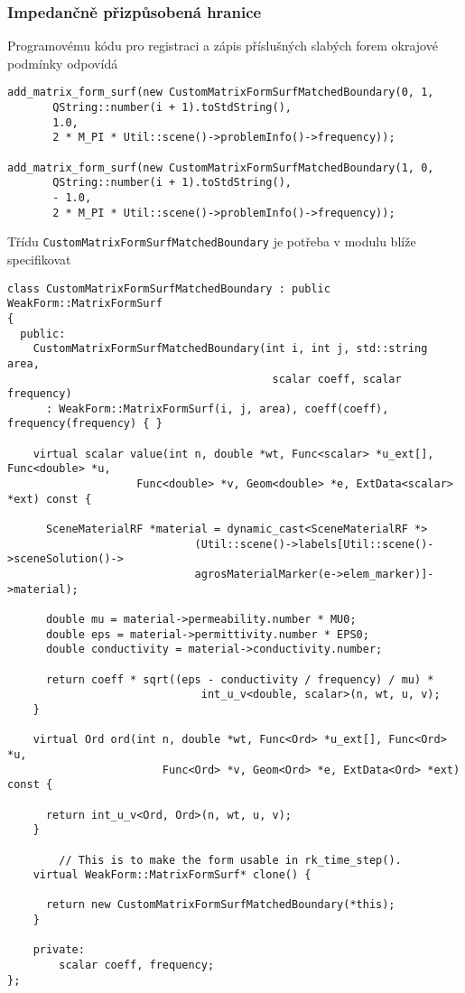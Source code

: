 \subsubsection*{Impedančně přizpůsobená hranice}
Programovému kódu pro registraci a zápis příslušných slabých forem okrajové podmínky odpovídá
\begin{verbatim}
add_matrix_form_surf(new CustomMatrixFormSurfMatchedBoundary(0, 1,
       QString::number(i + 1).toStdString(),
       1.0,
       2 * M_PI * Util::scene()->problemInfo()->frequency));
       
add_matrix_form_surf(new CustomMatrixFormSurfMatchedBoundary(1, 0,
       QString::number(i + 1).toStdString(),
       - 1.0,
       2 * M_PI * Util::scene()->problemInfo()->frequency));            
\end{verbatim}
Třídu \texttt{CustomMatrixFormSurfMatchedBoundary} je potřeba v modulu blíže specifikovat
\begin{verbatim}
class CustomMatrixFormSurfMatchedBoundary : public WeakForm::MatrixFormSurf
{
  public:
    CustomMatrixFormSurfMatchedBoundary(int i, int j, std::string area, 
                                         scalar coeff, scalar frequency)
      : WeakForm::MatrixFormSurf(i, j, area), coeff(coeff), frequency(frequency) { }

    virtual scalar value(int n, double *wt, Func<scalar> *u_ext[], Func<double> *u, 
                    Func<double> *v, Geom<double> *e, ExtData<scalar> *ext) const {
      
      SceneMaterialRF *material = dynamic_cast<SceneMaterialRF *>
                             (Util::scene()->labels[Util::scene()->sceneSolution()->
                             agrosMaterialMarker(e->elem_marker)]->material);

      double mu = material->permeability.number * MU0;
      double eps = material->permittivity.number * EPS0;
      double conductivity = material->conductivity.number;

      return coeff * sqrt((eps - conductivity / frequency) / mu) * 
                              int_u_v<double, scalar>(n, wt, u, v);
    }

    virtual Ord ord(int n, double *wt, Func<Ord> *u_ext[], Func<Ord> *u,
                        Func<Ord> *v, Geom<Ord> *e, ExtData<Ord> *ext) const {
    
      return int_u_v<Ord, Ord>(n, wt, u, v);
    }

        // This is to make the form usable in rk_time_step().
    virtual WeakForm::MatrixFormSurf* clone() {

      return new CustomMatrixFormSurfMatchedBoundary(*this);
    }

    private:
        scalar coeff, frequency;
};
\end{verbatim}

